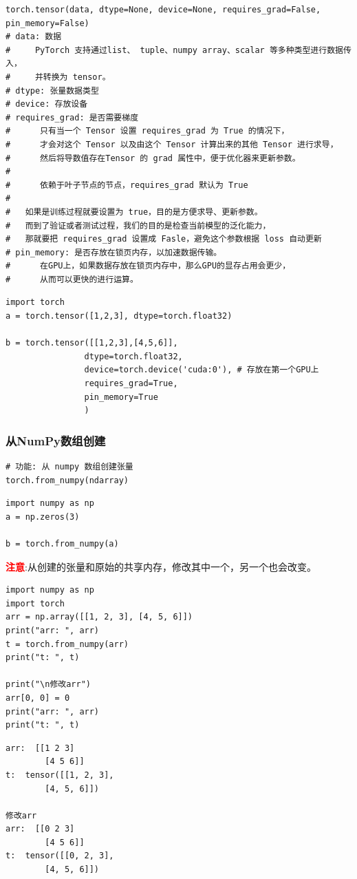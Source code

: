 \begin{lstlisting}[style=demostyle,numbers=none]
torch.tensor(data, dtype=None, device=None, requires_grad=False, pin_memory=False)
# data: 数据
#     PyTorch 支持通过list、 tuple、numpy array、scalar 等多种类型进行数据传入，
#     并转换为 tensor。
# dtype: 张量数据类型
# device: 存放设备
# requires_grad: 是否需要梯度
#      只有当一个 Tensor 设置 requires_grad 为 True 的情况下，
#      才会对这个 Tensor 以及由这个 Tensor 计算出来的其他 Tensor 进行求导，
#      然后将导数值存在Tensor 的 grad 属性中，便于优化器来更新参数。
#      
#      依赖于叶子节点的节点，requires_grad 默认为 True
#
#   如果是训练过程就要设置为 true，目的是方便求导、更新参数。
#   而到了验证或者测试过程，我们的目的是检查当前模型的泛化能力，
#   那就要把 requires_grad 设置成 Fasle，避免这个参数根据 loss 自动更新
# pin_memory: 是否存放在锁页内存，以加速数据传输。
#      在GPU上，如果数据存放在锁页内存中，那么GPU的显存占用会更少，
#      从而可以更快的进行运算。
\end{lstlisting}

\begin{lstlisting}[style=pythonstyle]
import torch
a = torch.tensor([1,2,3], dtype=torch.float32)

b = torch.tensor([[1,2,3],[4,5,6]], 
                dtype=torch.float32,
                device=torch.device('cuda:0'), # 存放在第一个GPU上
                requires_grad=True,
                pin_memory=True
                )
\end{lstlisting}





\subsubsection{从NumPy数组创建}
\begin{lstlisting}[style=demostyle,numbers=none]
# 功能: 从 numpy 数组创建张量
torch.from_numpy(ndarray)
\end{lstlisting}

\begin{lstlisting}[style=pythonstyle]
import numpy as np
a = np.zeros(3)

b = torch.from_numpy(a)
\end{lstlisting}

\textcolor{red}{\textbf{注意}}:从创建的张量和原始的共享内存，修改其中一个，另一个也会改变。
\begin{lstlisting}[style=pythonstyle]
import numpy as np
import torch
arr = np.array([[1, 2, 3], [4, 5, 6]])
print("arr: ", arr)
t = torch.from_numpy(arr)
print("t: ", t)

print("\n修改arr")
arr[0, 0] = 0
print("arr: ", arr)
print("t: ", t)
\end{lstlisting}
\begin{lstlisting}[style=demostyle,numbers=none]
arr:  [[1 2 3]
        [4 5 6]]
t:  tensor([[1, 2, 3],
        [4, 5, 6]])

修改arr
arr:  [[0 2 3]
        [4 5 6]]
t:  tensor([[0, 2, 3],
        [4, 5, 6]]) 
\end{lstlisting}  

